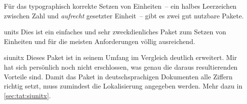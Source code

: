 \documentclass[%
  english,ngerman,%
  headings=optiontoheadandtoc,captions=tableheading,numbers=noenddot,%
  chapterpage,cdfoot,%
]{tudscrman}
\begin{document}
Für das typographisch korrekte Setzen von Einheiten~-- ein halbes Leerzeichen 
zwischen Zahl und \emph{aufrecht} gesetzter Einheit~-- gibt es zwei gut nutzbare 
Pakete.
\begin{packages}
\item[units]
  Dies ist ein einfaches und sehr zweckdienliches Paket zum Setzen von Einheiten 
  und für die meisten Anforderungen völlig ausreichend.
\item[siunitx]
  Dieses Paket ist in seinem Umfang im Vergleich deutlich erweitert. Mir hat 
  sich persönlich noch nicht erschlossen, was genau die daraus resultierenden 
  Vorteile sind. Damit das Paket in deutschsprachigen Dokumenten alle Ziffern 
  richtig setzt, muss zumindest die Lokalisierung angegeben werden. Mehr dazu in 
  \autoref{sec:tat:siunitx}.
\end{packages}
\end{document}
